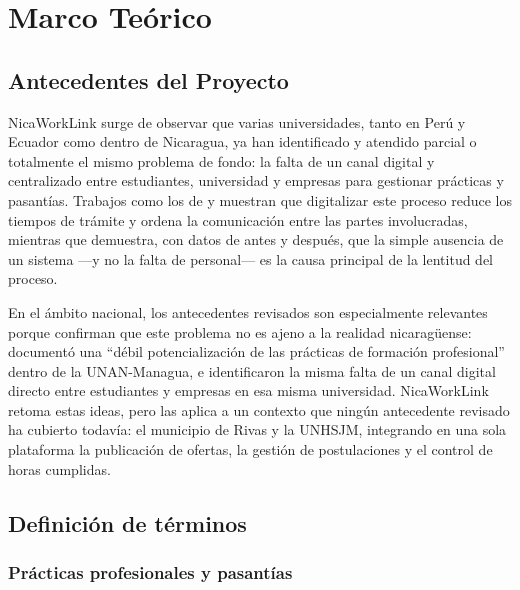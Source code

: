 
\section{Marco Teórico}

\subsection{Antecedentes del Proyecto}

NicaWorkLink surge de observar que varias universidades, tanto en Perú y Ecuador como dentro de Nicaragua, ya han identificado y atendido parcial o totalmente el mismo problema de fondo: la falta de un canal digital y centralizado entre estudiantes, universidad y empresas para gestionar prácticas y pasantías. Trabajos como los de \textcite{gomezatoche2025} y \textcite{tene2021} muestran que digitalizar este proceso reduce los tiempos de trámite y ordena la comunicación entre las partes involucradas, mientras que \textcite{torresremon2022} demuestra, con datos de antes y después, que la simple ausencia de un sistema ---y no la falta de personal--- es la causa principal de la lentitud del proceso.

En el ámbito nacional, los antecedentes revisados son especialmente relevantes porque confirman que este problema no es ajeno a la realidad nicaragüense: \textcite{aleman2020} documentó una ``débil potencialización de las prácticas de formación profesional'' dentro de la UNAN-Managua, e \textcite{iglesiasgaray2017} identificaron la misma falta de un canal digital directo entre estudiantes y empresas en esa misma universidad. NicaWorkLink retoma estas ideas, pero las aplica a un contexto que ningún antecedente revisado ha cubierto todavía: el municipio de Rivas y la UNHSJM, integrando en una sola plataforma la publicación de ofertas, la gestión de postulaciones y el control de horas cumplidas.

\subsection{Definición de términos}

\subsubsection{Prácticas profesionales y pasantías}

